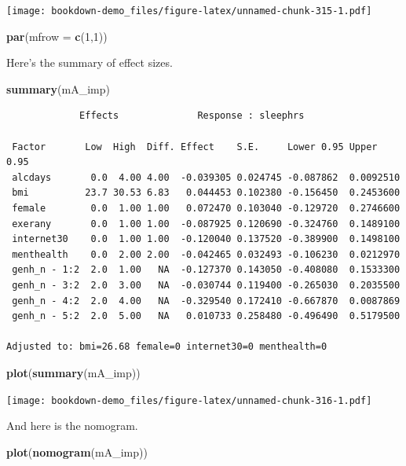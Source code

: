 \documentclass[]{book}
\newenvironment{Shaded}{\begin{snugshade}}{\end{snugshade}}
\newcommand{\KeywordTok}[1]{\textcolor[rgb]{0.13,0.29,0.53}{\textbf{#1}}}
\newcommand{\DataTypeTok}[1]{\textcolor[rgb]{0.13,0.29,0.53}{#1}}
\newcommand{\DecValTok}[1]{\textcolor[rgb]{0.00,0.00,0.81}{#1}}
\newcommand{\NormalTok}[1]{#1}
\theoremstyle{definition}
\theoremstyle{definition}
\theoremstyle{definition}
\theoremstyle{remark}
\begin{document}
\texttt{[image: bookdown-demo\_files/figure-latex/unnamed-chunk-315-1.pdf]}

\begin{Shaded}
\begin{Highlighting}[]
\KeywordTok{par}\NormalTok{(}\DataTypeTok{mfrow =} \KeywordTok{c}\NormalTok{(}\DecValTok{1}\NormalTok{,}\DecValTok{1}\NormalTok{))}
\end{Highlighting}
\end{Shaded}

Here's the summary of effect sizes.

\begin{Shaded}
\begin{Highlighting}[]
\KeywordTok{summary}\NormalTok{(mA_imp)}
\end{Highlighting}
\end{Shaded}

\begin{verbatim}
             Effects              Response : sleephrs 

 Factor       Low  High  Diff. Effect    S.E.     Lower 0.95 Upper 0.95
 alcdays       0.0  4.00 4.00  -0.039305 0.024745 -0.087862  0.0092510 
 bmi          23.7 30.53 6.83   0.044453 0.102380 -0.156450  0.2453600 
 female        0.0  1.00 1.00   0.072470 0.103040 -0.129720  0.2746600 
 exerany       0.0  1.00 1.00  -0.087925 0.120690 -0.324760  0.1489100 
 internet30    0.0  1.00 1.00  -0.120040 0.137520 -0.389900  0.1498100 
 menthealth    0.0  2.00 2.00  -0.042465 0.032493 -0.106230  0.0212970 
 genh_n - 1:2  2.0  1.00   NA  -0.127370 0.143050 -0.408080  0.1533300 
 genh_n - 3:2  2.0  3.00   NA  -0.030744 0.119400 -0.265030  0.2035500 
 genh_n - 4:2  2.0  4.00   NA  -0.329540 0.172410 -0.667870  0.0087869 
 genh_n - 5:2  2.0  5.00   NA   0.010733 0.258480 -0.496490  0.5179500 

Adjusted to: bmi=26.68 female=0 internet30=0 menthealth=0  
\end{verbatim}

\begin{Shaded}
\begin{Highlighting}[]
\KeywordTok{plot}\NormalTok{(}\KeywordTok{summary}\NormalTok{(mA_imp))}
\end{Highlighting}
\end{Shaded}

\texttt{[image: bookdown-demo\_files/figure-latex/unnamed-chunk-316-1.pdf]}

And here is the nomogram.

\begin{Shaded}
\begin{Highlighting}[]
\KeywordTok{plot}\NormalTok{(}\KeywordTok{nomogram}\NormalTok{(mA_imp))}
\end{Highlighting}
\end{Shaded}
\end{document}
